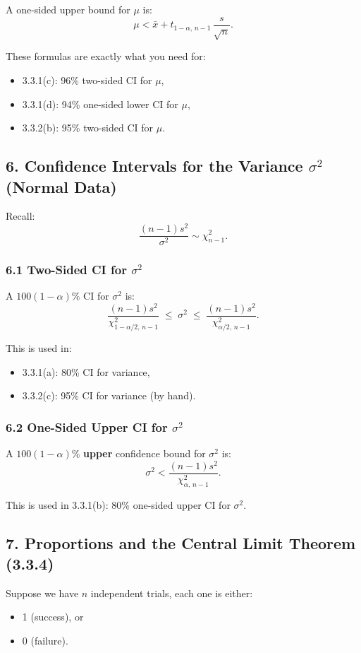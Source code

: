\documentclass[11pt,letterpaper]{article}
\theoremstyle{remark}
\begin{document}
A one-sided upper bound for $\mu$ is:
\[
\mu < \bar{x} + t_{1-\alpha,\,n-1}\,\frac{s}{\sqrt{n}}.
\]

These formulas are exactly what you need for:
\begin{itemize}
    \item 3.3.1(c): 96\% two-sided CI for $\mu$,
    \item 3.3.1(d): 94\% one-sided lower CI for $\mu$,
    \item 3.3.2(b): 95\% two-sided CI for $\mu$.
\end{itemize}

\subsection*{6. Confidence Intervals for the Variance $\sigma^2$ (Normal Data)}

Recall:
\[
\frac{(n-1)s^2}{\sigma^2} \sim \chi^2_{n-1}.
\]

\subsubsection*{6.1 Two-Sided CI for $\sigma^2$}

A $100(1-\alpha)\%$ CI for $\sigma^2$ is:
\[
\frac{(n-1)s^2}{\chi^2_{1-\alpha/2,\, n-1}}
\;\le\; \sigma^2 \;\le\;
\frac{(n-1)s^2}{\chi^2_{\alpha/2,\, n-1}}.
\]

This is used in:
\begin{itemize}
    \item 3.3.1(a): 80\% CI for variance,
    \item 3.3.2(c): 95\% CI for variance (by hand).
\end{itemize}

\subsubsection*{6.2 One-Sided Upper CI for $\sigma^2$}

A $100(1-\alpha)\%$ \textbf{upper} confidence bound for $\sigma^2$ is:
\[
\sigma^2 < \frac{(n-1)s^2}{\chi^2_{\alpha,\, n-1}}.
\]

This is used in 3.3.1(b): 80\% one-sided upper CI for $\sigma^2$.

\subsection*{7. Proportions and the Central Limit Theorem (3.3.4)}

Suppose we have $n$ independent trials, each one is either:
\begin{itemize}
    \item 1 (success), or
    \item 0 (failure).
\end{itemize}
\end{document}
